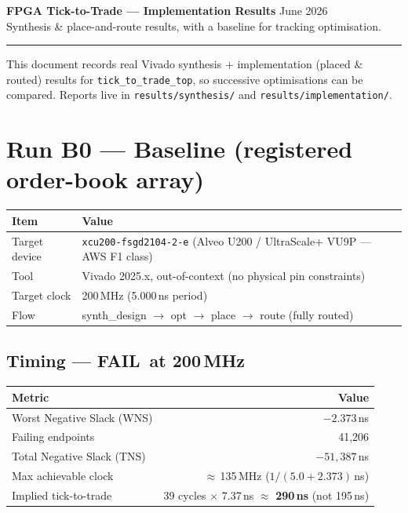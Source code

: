 \documentclass[10pt,a4paper]{article}
\newcommand{\fail}{\textcolor{badred}{\textbf{FAIL}}}
\begin{document}
{\LARGE\bfseries\color{fpgablue} FPGA Tick-to-Trade --- Implementation Results}\hfill
{\small\color{rulegray} June 2026}\\[-1pt]
{\large Synthesis \& place-and-route results, with a baseline for tracking optimisation.}

\textcolor{rulegray}{\rule{\linewidth}{1pt}}

This document records real Vivado synthesis + implementation (placed \& routed)
results for \texttt{tick\_to\_trade\_top}, so successive optimisations can be
compared. Reports live in \texttt{results/synthesis/} and
\texttt{results/implementation/}.

\section*{Run B0 --- Baseline (registered order-book array)}

\begin{center}
\renewcommand{\arraystretch}{1.25}
\begin{tabular}{@{}l l@{}}
\toprule
\textbf{Item} & \textbf{Value} \\
\midrule
Target device       & \texttt{xcu200-fsgd2104-2-e} (Alveo U200 / UltraScale+ VU9P --- AWS F1 class) \\
Tool                & Vivado 2025.x, out-of-context (no physical pin constraints) \\
Target clock        & 200\,MHz (5.000\,ns period) \\
Flow                & synth\_design $\rightarrow$ opt $\rightarrow$ place $\rightarrow$ route (fully routed) \\
\bottomrule
\end{tabular}
\end{center}

\subsection*{Timing --- \fail\ at 200\,MHz}
\begin{center}
\renewcommand{\arraystretch}{1.2}
\begin{tabular}{@{}l r@{}}
\toprule
\textbf{Metric} & \textbf{Value} \\
\midrule
Worst Negative Slack (WNS)  & \textcolor{badred}{$-2.373$\,ns} \\
Failing endpoints           & 41{,}206 \\
Total Negative Slack (TNS)  & $-51{,}387$\,ns \\
Max achievable clock        & $\approx$\,135\,MHz \;($1/(5.0{+}2.373)$\,ns) \\
Implied tick-to-trade       & 39 cycles $\times$ 7.37\,ns $\approx$ \textbf{290\,ns} (not 195\,ns) \\
\bottomrule
\end{tabular}
\end{center}
\end{document}
